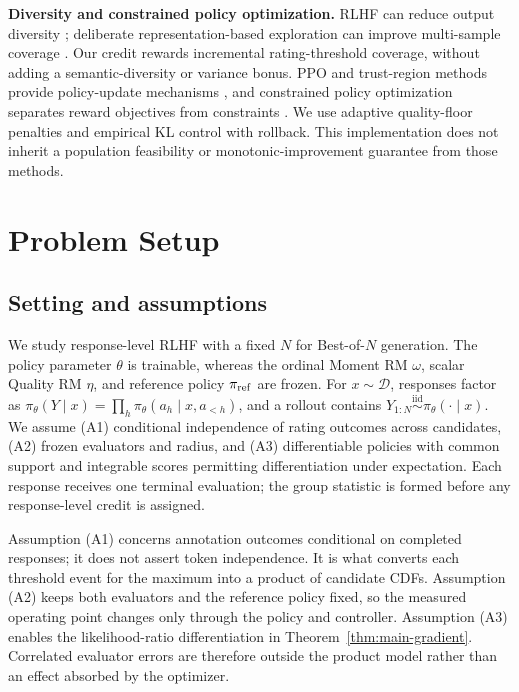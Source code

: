 \documentclass{article}
\theoremstyle{definition}
\theoremstyle{remark}
\begin{document}
\textbf{Diversity and constrained policy optimization.}
RLHF can reduce output diversity \citep{kirk2024understanding}; deliberate
representation-based exploration can improve multi-sample coverage
\citep{tuyls2026representation}. Our credit rewards incremental rating-threshold
coverage, without adding a semantic-diversity or variance bonus.
PPO and trust-region methods provide policy-update mechanisms
\citep{schulman2017proximal,schulman2015trust}, and constrained policy
optimization separates reward objectives from constraints
\citep{achiam2017constrained}. We use adaptive quality-floor penalties and
empirical KL control with rollback. This implementation does not inherit a
population feasibility or monotonic-improvement guarantee from those methods.

\section{Problem Setup}
\label{sec:problem-setup}

\subsection{Setting and assumptions}
We study response-level RLHF with a fixed \(N\) for Best-of-\(N\) generation.  The
policy parameter \(\theta\) is trainable, whereas the ordinal Moment RM \(\omega\),
scalar Quality RM \(\eta\), and reference policy \(\pi_{\rm ref}\) are frozen.
For \(x\sim\mathcal D\), responses factor as
\(\pi_\theta(Y\mid x)=\prod_h\pi_\theta(a_h\mid x,a_{<h})\), and a rollout
contains \(Y_{1:N}\overset{\mathrm{iid}}{\sim}\pi_\theta(\cdot\mid x)\).  We
assume (A1) conditional independence of rating outcomes across candidates, (A2)
frozen evaluators and radius, and (A3) differentiable policies with common
support and integrable scores permitting differentiation under expectation. Each response
receives one terminal evaluation; the group statistic is formed before any
response-level credit is assigned.

Assumption (A1) concerns annotation outcomes conditional on completed
responses; it does not assert token independence.  It is what converts each
threshold event for the maximum into a product of candidate CDFs.  Assumption
(A2) keeps both evaluators and the reference policy fixed, so the measured
operating point changes only through the policy and controller.  Assumption (A3) enables
the likelihood-ratio differentiation in Theorem~\ref{thm:main-gradient}.
Correlated evaluator errors are therefore outside the product model rather than
an effect absorbed by the optimizer.
\end{document}
